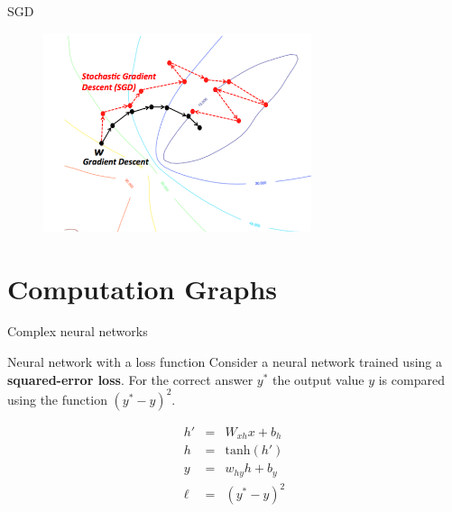 \begin{frame}{SGD}
\begin{figure}
\centering
\includegraphics[width=0.70\textwidth]{figures/ff/sgd.png}
\end{figure}
\end{frame}


\section{Computation Graphs}
\frame{\tableofcontents[currentsection]}


\begin{frame}{Complex neural networks}
\begin{block}{Neural network with a loss function}
Consider a neural network trained using a \textbf{squared-error loss}. 
For the correct answer $y^\ast$ the output value $y$ is compared using
the function $(y^\ast - y)^2$.

	\begin{eqnarray*}
		h' &=& W_{xh} x + b_h \\
		h &=& \text{tanh}(h') \\
		y &=& w_{hy} h + b_y \\
		\ell &=& (y^\ast - y)^2
	\end{eqnarray*}
\end{block}

\end{frame}

